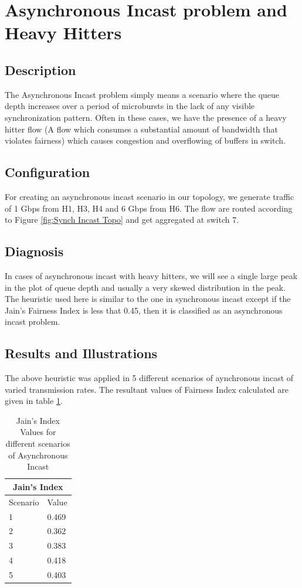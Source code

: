 \section{Asynchronous Incast problem and Heavy Hitters}
\subsection{Description}
The Asynchronous Incast problem simply means a scenario where the queue depth increases over a period of microbursts
in the lack of any visible synchronization pattern. Often in these cases, we have the presence of a heavy hitter flow\cite{HH}
(A flow which consumes a substantial amount of bandwidth that violates fairness) which causes congestion and overflowing
of buffers in switch.
\subsection{Configuration}
For creating an asynchronous incast scenario in our topology, we generate traffic of 1 Gbps from H1, H3, H4 and 6 Gbps from H6. The flow are routed
according to Figure \ref{fig:Synch Incast Topo} and get aggregated at switch 7.
\subsection{Diagnosis}
In cases of asynchronous incast with heavy hitters, we will see a single large peak in the plot of queue depth and usually a very
skewed distribution in the peak. The heuristic used here is similar to the one in synchronous incast except if the Jain's 
Fairness Index is less that 0.45, then it is classified as an asynchronous incast problem.
\subsection{Results and Illustrations}

The above heuristic was applied in 5 different scenarios of aynchronous incast of varied transmission rates.
The resultant values of Fairness Index calculated are given in table \ref{tab:J_Index_Async}.
\begin{table}[h]
	\begin{center}
	\begin{tabular}{ |p{3cm}|p{3cm}|  }
		\hline
		\multicolumn{2}{|c|}{Jain's Index} \\
		\hline
		Scenario & Value \\
		\hline
		1 & 0.469 \\
		2 & 0.362 \\
		3 & 0.383 \\
		4 & 0.418 \\
		5 & 0.403 \\
		\hline
	   \end{tabular}
	\end{center}
	
	\caption{Jain's Index Values for different scenarios of Asynchronous Incast}
	\label{tab:J_Index_Async}
	\end{table}

